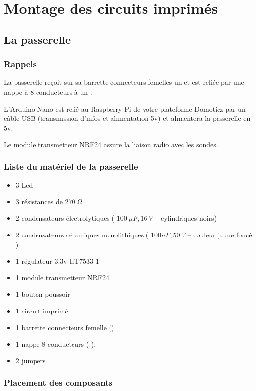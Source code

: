\part{Montage des circuits imprimés}

\chapter{La passerelle}

\section{Rappels}

La passerelle reçoit sur sa barrette connecteurs femelles un  et est reliée par une nappe à 8 conducteurs à un .

L'Arduino Nano est relié au Raspberry Pi de votre plateforme Domoticz par un câble USB (transmission d'infos et alimentation 5v) et alimentera la passerelle en 5v.

Le module transmetteur NRF24 assure la liaison radio avec les sondes. 

\section{Liste du matériel de la passerelle}

\begin{itemize}
    \item 3 Led
    \item 3 résistances de $270~\Omega$
    \item 2 condensateurs électrolytiques ( $100~\mu F, 16~V$ – cylindriques noirs)
    \item 2 condensateurs céramiques monolithiques ( $100nF, 50~V$ – couleur jaune foncé )
    \item 1 régulateur 3.3v HT7533-1
    \item 1 module transmetteur NRF24
    \item 1 bouton poussoir
    \item 1 circuit imprimé
    \item 1 barrette connecteurs femelle ({\color{red}{déjà montée sur le circuit imprimé}})
    \item 1 nappe 8 conducteurs ({\color{red}{dont l'un porte un liseré rouge}} ),
    \item 2 jumpers
\end{itemize}

\section{Placement des composants}

